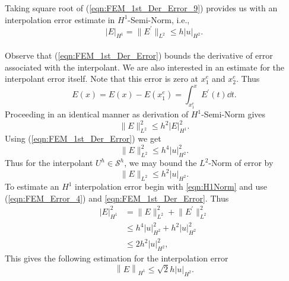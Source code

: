 Taking square root of (\ref{eqn:FEM_1st_Der_Error_9}) provides us with an interpolation error estimate in $H^1$-Semi-Norm, i.e.,
\begin{equation}	\label{eqn:FEM_1st_Der_Error}
	\big \vert E \big \vert_{ H^1 } = \big\| E^{\prime } \big\|_{ L^2 } \leq h \big \vert u \big \vert_{ H^2 }.
\end{equation} \\
Observe that (\ref{eqn:FEM_1st_Der_Error}) bounds the derivative of error associated with the interpolant. We are also
interested in an estimate for the interpolant error itself. Note that this error is zero at $x_1^e$ and $x_2^e$. Thus
\begin{equation}	\label{eqn:FEM_Error_2}
	E \left( x \right) = E \left( x \right) - E \left( x_1^e \right) = \int_{x_1^e}^x E^{ \prime } \left( t \right) \dd t.
\end{equation}
Proceeding in an identical manner as derivation of $H^1$-Semi-Norm gives
\begin{equation}	\label{eqn:FEM_Error_3}
	\big\| E \big\|_{ L^2 }^2 \leq h^2 \big \vert E \big \vert_{ H^1 }^2.
\end{equation}
Using (\ref{eqn:FEM_1st_Der_Error}) we get
\begin{equation}	\label{eqn:FEM_Error_4}
	\big\| E \big\|_{ L^2 }^2 \leq h^4 \big \vert u \big \vert_{ H^2 }^2.
\end{equation}
Thus for the interpolant $U^h \in \mathcal{S}^h$, we may bound the $L^2$-Norm of error by
\begin{equation}	\label{eqn:FEM_Error_5}
	\big\| E \big\|_{ L^2 } \leq h^2 \big \vert u \big \vert_{ H^2 }.
\end{equation}
To estimate an $H^1$ interpolation error begin with \cref{eqn:H1Norm} and use (\ref{eqn:FEM_Error_4}) and
\cref{eqn:FEM_1st_Der_Error}. Thus
\begin{equation}	\label{eqn:FEM_Error_6}
	\begin{aligned}
		\big \vert E \big \vert_{ H^1 }^2 &= \big\| E \big\|_{ L^2 }^2 + \big\| E^{\prime} \big\|_{ L^2 }^2	\\
		&\leq h^4 \big \vert u \big \vert_{ H^2 }^2 + h^2 \big \vert u \big \vert_{ H^2 }^2	\\
		&\leq 2 h^2 \big \vert u \big \vert_{ H^2 }^2,
	\end{aligned}
\end{equation}
This gives the following estimation for the interpolation error
\begin{equation}	\label{eqn:FEM_Error_in_H1}
	\left\| E \right\|_{ H^1 } \leq \sqrt{2} h \Big \vert u \Big \vert_{ H^2 }.
\end{equation}

